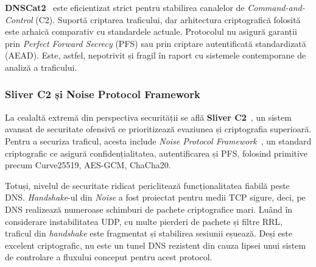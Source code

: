 \textbf{DNSCat2}~\cite{dnscat2} este eficientizat strict pentru stabilirea canalelor de \textit{Command-and-Control} (C2). Suportă criptarea traficului, dar arhitectura criptografică folosită este arhaică comparativ cu standardele actuale. Protocolul nu asigură garanții prin \textit{Perfect Forward Secrecy} (PFS) sau prin criptare autentificată standardizată (AEAD). Este, astfel, nepotrivit și fragil în raport cu sistemele contemporane de analiză a traficului.

\subsubsection{Sliver C2 și Noise Protocol Framework}
La cealaltă extremă din perspectiva securității se află \textbf{Sliver C2}~\cite{sliver_c2}, un sistem avansat de securitate ofensivă ce prioritizează evaziunea și criptografia superioară. Pentru a securiza traficul, acesta include \textit{Noise Protocol Framework}~\cite{noise_protocol}, un standard criptografic ce asigură confidențialitatea, autentificarea și PFS, folosind primitive precum Curve25519, AES-GCM, ChaCha20.

Totuși, nivelul de securitate ridicat periclitează funcționalitatea fiabilă peste DNS. \textit{Handshake}-ul din \textit{Noise} a fost proiectat pentru medii TCP sigure, deci, pe DNS realizează numeroase schimburi de pachete criptografice mari. Luând în considerare instabilitatea UDP, cu multe pierderi de pachete și filtre RRL, traficul din \textit{handshake} este fragmentat și stabilirea sesiunii eșuează. Deși este excelent criptografic, nu este un tunel DNS rezistent din cauza lipsei unui sistem de controlare a fluxului conceput pentru acest protocol.